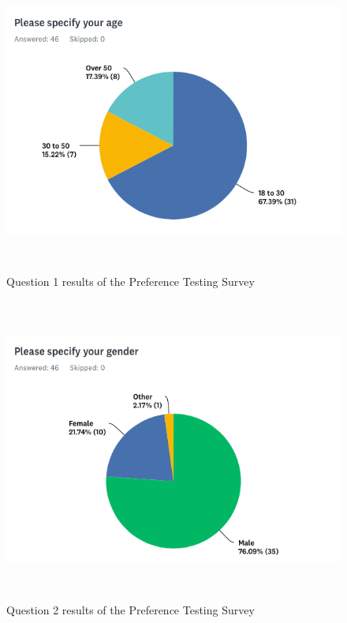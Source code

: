 \clearpage
\begin{figure}[H]
    \includegraphics[height=10cm, center]{figures/surveyresult1}
    \caption{Question 1 results of the Preference Testing Survey}
    \label{fig:surveyresult1}
\end{figure}
\begin{figure}[H]
    \includegraphics[height=10cm, center]{figures/surveyresult2}
    \caption{Question 2 results of the Preference Testing Survey}
    \label{fig:surveyresult2}
\end{figure}
